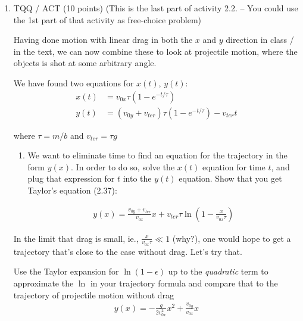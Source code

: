 \documentclass[12pt]{article}
\begin{document}
\begin{enumerate}
  \item TQQ / ACT (10 points) (This is the last part of activity 2.2.  -- You could use the 1st part of that activity as free-choice problem)

        Having done motion with linear drag in both the $x$ and $y$ direction in class / in the text, we can now combine these to look at projectile motion, where the objects is shot at some arbitrary angle.

        We have found two equations for $x(t)$, $y(t)$:
        \begin{align}
          x(t) & = v_{0x} \tau \left(1 - e^{-t/\tau}\right)                         \\
          y(t) & = (v_{0y} + v_{ter}) \tau \left(1 - e^{-t/\tau}\right) - v_{ter} t
        \end{align}

        where $\tau = m / b$ and $v_{ter} = \tau g$

        \begin{enumerate}
          \item We want to eliminate time to find an equation for the trajectory in the form $y(x)$. In order to do so, solve the $x(t)$ equation for time $t$, and plug that expression for $t$ into the $y(t)$ equation. Show that you get Taylor's equation (2.37):

                \begin{align}
                  y(x) = \frac{v_{0y} + v_{ter}}{v_{0x}} x + v_{ter}\tau\ln\left(1-\frac{x}{v_{0x}\tau}\right)
                \end{align}
        \end{enumerate}

        In the limit that drag is small, ie., $\frac{x}{v_{0x}\tau} \ll 1$ (why?), one would hope to get a trajectory that's close to the case without drag. Let's try that.


        Use the Taylor expansion for $\ln(1-\epsilon)$ up to the \textit{quadratic} term to approximate the $\ln$ in your trajectory formula and compare that to the trajectory of projectile motion without drag
        \begin{align}
          y(x) = -\frac{g}{2v_{0x}^2} x^2 + \frac{v_{0y}}{v_{0x}} x
        \end{align}


\end{enumerate}
\end{document}
